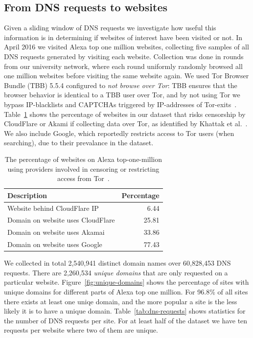 \subsection{From DNS requests to websites}
Given a sliding window of DNS requests we investigate
how useful this information is in determining if websites of interest have
been visited or not. In April 2016 we visited Alexa top one million websites,
collecting five samples of all DNS requests generated by visiting each website.
Collection was done in rounds from our university network, where
each round uniformly randomly browsed all one million websites before visiting
the same website again. We used Tor Browser Bundle (TBB) 5.5.4
configured to \emph{not browse over Tor}: TBB ensures that the browser behavior
is  identical to a TBB user over Tor, and by not using Tor we bypass
IP-blacklists and CAPTCHAs triggered by IP-addresses of
Tor-exits~\cite{Khattak2016a}.
Table~\ref{tab:dns-censor} shows the percentage of websites in our dataset that
risks censorship by CloudFlare or Akami if collecting data over Tor, as
identified by Khattak et al.~\cite{Khattak2016a}. We also include Google, which
reportedly restricts access to Tor users (when searching), due to
their prevalance in the dataset.

\begin{table}[t]
	\centering
	\caption{The percentage of websites on Alexa top-one-million using providers
	involved in censoring or restricting access from Tor~\cite{Khattak2016a}.}
	\begin{tabular}{l r}
	\toprule
	\textbf{Description} & \textbf{Percentage} \\
	\midrule
	Website behind CloudFlare IP & 6.44 \\
	Domain on website uses CloudFlare & 25.81 \\
	Domain on website uses Akamai & 33.86 \\
	Domain on website uses Google & 77.43 \\
	\bottomrule
	\end{tabular}
	\label{tab:dns-censor}
\end{table}

We collected in total 2,540,941 distinct domain names over 60,828,453 DNS
requests. There are 2,260,534 \emph {unique domains} that are only requested on
a particular website. Figure~\ref{fig:unique-domains} shows the percentage of
sites with unique domains for different parts of Alexa top one million.
For 96.8\% of all sites there exists at least one uniqe domain, and the more
popular a site is the less likely it is to have a unique domain.
Table~\ref{tab:dns-requests} shows statistics for the number of DNS requests per
site. For at least half of the dataset we have ten requests per website where
two of them are unique.

